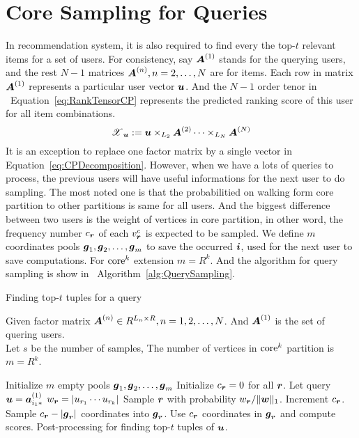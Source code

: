 \documentclass[letterpaper]{article}
\newcommand{\T}[1]{\boldsymbol{\mathscr{{#1}}}}
\newcommand{\V}[1]{{\bm{{\MakeLowercase{#1}}}}}
\newcommand{\VnC}[3]{\V{#1}^{(#2)}_{#3}}
\newcommand{\M}[1]{{\bm{{\MakeUppercase{#1}}}}}
\newcommand{\Mn}[2]{\M{#1}^{(#2)}}
\newcommand{\norm}[2]{\|#1\|_{#2}}
\newcommand{\Eqn}[1]   {Equation~\ref{eq:#1}}
\newcommand{\Alg}[1] {Algorithm~\ref{alg:#1}}
\begin{document}
\section{Core Sampling for Queries}
In recommendation system,
it is also required to find every the top-$t$ relevant items for a set of users.
For consistency,
say $\M{A}^{(1)}$ stands for the querying users,
and the rest $N-1$ matrices $\M{A}^{(n)},n=2,\ldots,N$ are for items.
Each row in matrix $\M{A}^{(1)}$ represents a particular user vector $\V{u}$.
And the $N-1$ order tenor in ~\Eqn{RankTensorCP}
represents the predicted ranking score of this user for all item combinations.
\begin{equation}\label{eq:RankTensorCP}
\T{X}_{\V{u}} := \V{u}\times_{L_2}\Mn{A}{2}\cdots\times_{L_N}\Mn{A}{N}
\end{equation}
It is an exception to replace one factor matrix by a single vector in \Eqn{CPDecomposition}.
However, when we have a lots of queries to process,
the previous users will have useful informations for the next user to do sampling.
The most noted one is that
the probabilitied on walking form core partition to other partitions is same for all users.
And the biggest difference between two users is the weight of vertices in core partition,
in other word,
the frequency number $c_{\V{r}}$ of each $v^c_{\V{r}}$ is expected to be sampled.
We define $m$ coordinates pools $\V{g}_1,\V{g}_2,\ldots,\V{g}_{m}$ to save the occurred $\V{i}$,
used for the next user to save computations.
For ${\rm core}^k$ extension $m = R^k$.
And the algorithm for query sampling is show in ~\Alg{QuerySampling}.

\begin{algorithm}[t]
    \caption{Finding top-$t$ tuples for a query}
    \label{alg:QuerySampling}
        Given factor matrix $\M{A}^{(n)}\in R^{L_n\times R}, n = 1,2,\ldots,N$.
        And $\M{A}^{(1)}$ is the set of quering users.\\
        Let $s$ be the number of samples,
        The number of vertices in ${\rm core}^k$ partition is $m=R^k$.
    \begin{algorithmic}[1]
    \State Initialize $m$ empty pools $\V{g}_1,\V{g}_2,\ldots,\V{g}_m$
    \State Initialize $c_{\V{r}} = 0$ for all $\V{r}$.
    \State Let query $\V{u}=\VnC{a}{1}{i_1*}$
    \ForAll{$\V{r}$}
    \State $w_\V{r} = |u_{r_1}\cdots u_{r_k}|$
    \EndFor
    \State Sample $\V{r}$ with probability $w_\V{r}/\norm{\V{W}}{1}$.
    \label{line:Indexes}
    \State  Increment $c_{\V{r}}$.
    \EndFor
    \ForAll {$\V{r}$}
    \If {$c_\V{r} > |\V{g}_\V{r}|$ }
    \State Sample $c_{\V{r}} - |\V{g}_{\V{r}}|$ coordinates into $\V{g}_{\V{r}}$.
    \EndIf
    \State Use $c_{\V{r}}$ coordinates in $\V{g}_{\V{r}}$ and compute scores.
    \EndFor
    \State Post-processing for finding top-$t$ tuples of $\V{u}$.
    \EndFor
    \end{algorithmic}
\end{algorithm}
\end{document}
